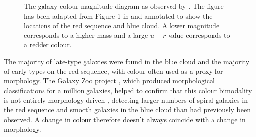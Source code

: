 \begin{figure}[t]
\caption[Galaxy Colour Magnitude Diagram from \cite{Baldry04}]{The galaxy colour magnitude diagram as observed by \cite{Baldry04}. The figure has been adapted from Figure 1 in \citeauthor{Baldry04} and annotated to show the locations of the red sequence and blue cloud. A lower magnitude corresponds to a higher mass and a large $u-r$ value corresponds to a redder colour.}
\label{fig:cmdbaldry}
\end{figure}


The majority of {\minor late-type} galaxies were found in the blue cloud and the majority of {\minor early-types} on the red sequence, with colour often used as a proxy for morphology. The Galaxy Zoo project \citep{lintott08, Lintott11}, which produced morphological classifications for a million galaxies, helped to confirm that this colour bimodality is not entirely morphology driven \citep{Strat01, Salim07, Sch07, CHV08, Bamford09, Skibba09}, detecting larger numbers of spiral galaxies in the red sequence \citep{masters10c} and smooth galaxies in the blue cloud \citep{Sch09} than had previously been observed. A change in colour therefore doesn't always coincide with a change in morphology. 

